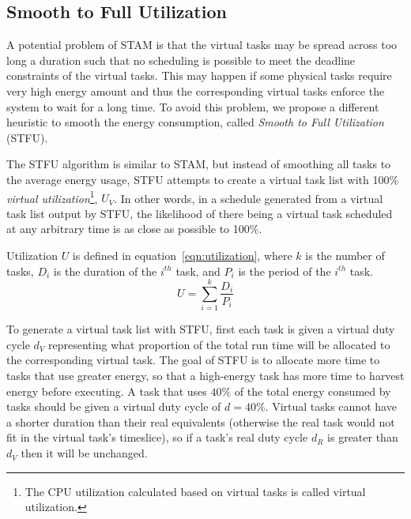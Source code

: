 \subsection{Smooth to Full Utilization}

A potential problem of STAM is that the virtual tasks may be spread across too long a duration such that no scheduling is possible to meet the deadline constraints of the virtual tasks. This may happen if some physical tasks require very high energy amount and thus the corresponding virtual tasks enforce the system to wait for a long time. To avoid this problem, we propose a different heuristic to smooth the energy consumption, called \emph{Smooth to Full Utilization} (\textsc{STFU}).  

The \textsc{STFU} algorithm is similar to STAM, but instead of smoothing all tasks to the average energy usage, \textsc{STFU} attempts to create a virtual task list with 100\% \emph{virtual utilization}\footnote{The CPU utilization calculated based on virtual tasks is called virtual utilization.}, $U_V$.  In other words, in a schedule generated from a virtual task list output by \textsc{STFU}, the likelihood of there being a virtual task scheduled at any arbitrary time is as close as possible to 100\%.

Utilization $U$ is defined in equation~\ref{eqn:utilization}, where $k$ is the number of tasks, $D_i$ is the duration of the $i^{th}$ task, and $P_i$ is the period of the $i^{th}$ task.
\begin{equation}
\label{eqn:utilization}
U = \sum_{i=1}^{k} \frac{D_i}{P_i}
\end{equation}


To generate a virtual task list with STFU, first each task is given a virtual duty cycle $d_V$ representing what proportion of the total run time will be allocated to the corresponding virtual task.  The goal of STFU is to allocate more time to tasks that use greater energy, so that a high-energy task has more time to harvest energy before executing.  A task that uses $40\%$ of the total energy consumed by tasks should be given a virtual duty cycle of $d=40\%$.  Virtual tasks cannot have a shorter duration than their real equivalents (otherwise the real task would not fit in the virtual task's timeslice), so if a task's real duty cycle $d_R$ is greater than $d_V$ then it will be unchanged.

